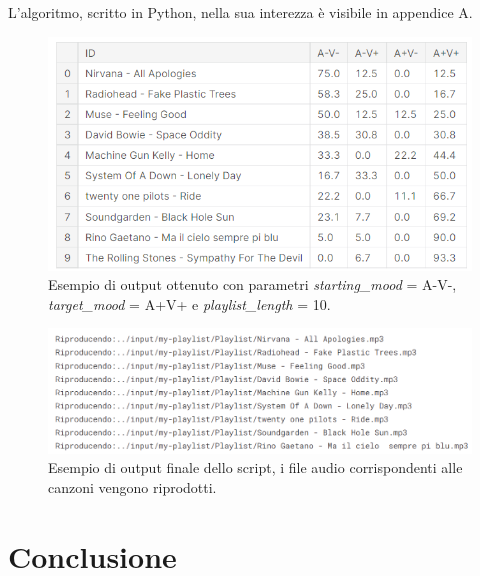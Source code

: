 \documentclass[11pt]{report}
\begin{document}
L'algoritmo, scritto in Python, nella sua interezza è visibile in appendice A.

\newpage

\begin{figure}[h]
\centering
\includegraphics[scale = 0.95]{img/output-playlist.PNG}
\caption{Esempio di output ottenuto con parametri \textit{starting\_mood} = A-V-, \textit{target\_mood} = A+V+ e \textit{playlist\_length} = 10.}
\label{fig:playlist1}
\end{figure}

\vspace{2cm}

\begin{figure}[h]
\centering
\includegraphics[scale = 0.8]{img/output-playlist-play.PNG}
\caption{Esempio di output finale dello script, i file audio corrispondenti alle canzoni vengono riprodotti.}
\label{fig:playlist2}
\end{figure}




















\chapter{Conclusione}
\end{document}

